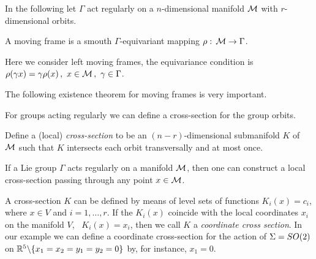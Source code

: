 In the following let $\Gamma$ act regularly on a $n$-dimensional manifold $\mathcal{M}$ with $r$-dimensional orbits.
\begin{definition}
 A moving frame is a smouth $\Gamma$-equivariant mapping $\rho:\,\mathcal{M} \rightarrow \Gamma$. 
\end{definition}
Here we consider left moving frames, \ie the equivariance condition is $\rho(\gamma x)=\gamma\rho(x)\,,\ x\in\Manif\,,\ \gamma\in\Gamma$.

The following existence theorem for moving frames is very important.

\begin{theorem}
 
\end{theorem}


For groups acting regularly we can define a cross-section for the group orbits.

\begin{definition}
\label{def:cross-section}
Define a (local) \emph{cross-section}
to be an $(n-r)$-dimensional submanifold $K$ of $\mathcal{M}$ such that $K$ intersects each orbit transversally and at most once.
\end{definition}


\begin{proposition}
 If a Lie group $\Gamma$ acts regularly on a manifold $\mathcal{M}$, then one can construct a local cross-section
 passing through any point $x\in \mathcal{M}$.
\end{proposition}

A cross-section $K$ can be defined by means of level sets of functions $K_i(x)=c_i$,
where $x\in V$ and $i=1,\ldots,r$. If the $K_i(x)$
coincide with the local coordinates $x_i$ on the manifold $V$, \ie~$K_i(x)=x_i$,
then we call $K$ a \emph{coordinate cross
section}. In our example we can define a coordinate cross-section for the action of
$\Sigma=SO(2)$ on $\mathbb{R}^{5}\backslash\{x_1=x_2=y_1=y_2=0\}$  by, for instance, $x_1=0$.

